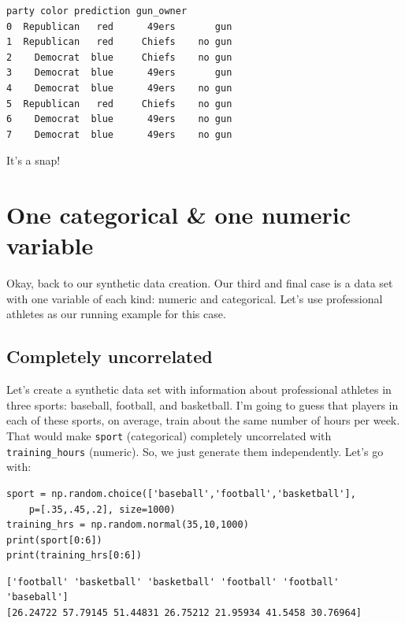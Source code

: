 \begin{Verbatim}[fontsize=\small,samepage=true,frame=leftline,framesep=5mm,framerule=1mm]
        party color prediction gun_owner
0  Republican   red      49ers       gun
1  Republican   red     Chiefs    no gun
2    Democrat  blue     Chiefs    no gun
3    Democrat  blue      49ers       gun
4    Democrat  blue      49ers    no gun
5  Republican   red     Chiefs    no gun
6    Democrat  blue      49ers    no gun
7    Democrat  blue      49ers    no gun
\end{Verbatim}

It's a snap!

\section{One categorical \& one numeric variable}

Okay, back to our synthetic data creation. Our third and final case is a data
set with one variable of each kind: numeric and categorical. Let's use
professional athletes as our running example for this case.

\subsection{Completely uncorrelated}

Let's create a synthetic data set with information about professional athletes
in three sports: baseball, football, and basketball. I'm going to guess that
players in each of these sports, on average, train about the same number of
hours per week. That would make \texttt{sport} (categorical) completely
uncorrelated with \texttt{training\_hours} (numeric). So, we just generate them
independently. Let's go with:

\begin{Verbatim}[fontsize=\footnotesize,samepage=true,frame=single,framesep=3mm]
sport = np.random.choice(['baseball','football','basketball'],
    p=[.35,.45,.2], size=1000)
training_hrs = np.random.normal(35,10,1000)
print(sport[0:6])
print(training_hrs[0:6])
\end{Verbatim}
\vspace{-.2in}

\begin{Verbatim}[fontsize=\scriptsize,samepage=true,frame=leftline,framesep=5mm,framerule=1mm]
['football' 'basketball' 'basketball' 'football' 'football' 'baseball']
[26.24722 57.79145 51.44831 26.75212 21.95934 41.5458 30.76964]
\end{Verbatim}

